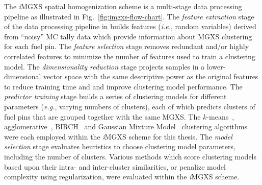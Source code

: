 \documentclass[12pt,twoside]{mitthesis-exec}
\begin{document}
The \textit{i}MGXS spatial homogenization scheme is a multi-stage data processing pipeline as illustrated in Fig.~\ref{fig:imgxs-flow-chart}. The \textit{feature extraction} stage of the data processing pipeline in builds features (\textit{i.e.}, random variables) derived from ``noisy'' MC tally data which provide information about MGXS clustering for each fuel pin. The \textit{feature selection} stage removes redundant and/or highly correlated features to minimize the number of features used to train a clustering model. The \textit{dimensionality reduction} stage projects samples in a lower-dimensional vector space with the same descriptive power as the original features to reduce training time and and improve clustering model performance. The \textit{predictor training} stage builds a series of clustering models for different parameters (\textit{e.g.}, varying numbers of clusters), each of which predicts clusters of fuel pins that are grouped together with the same MGXS. The $k$-means~\cite{macqueen1967kmeans, lloyd1982kmeans}, agglomerative~\cite{johnson1967hierarchical}, BIRCH~\cite{zhang1996birch} and Gaussian Mixture Model~\cite{mclachlan1988mixture} clustering algorithms were each employed within the \textit{i}MGXS scheme for this thesis. The \textit{model selection} stage evaluates heuristics to choose clustering model parameters, including the number of clusters. Various methods which score clustering models based upon their intra- and inter-cluster similarities, or penalize model complexity using regularization, were evaluated within the \textit{i}MGXS scheme.
\end{document}
